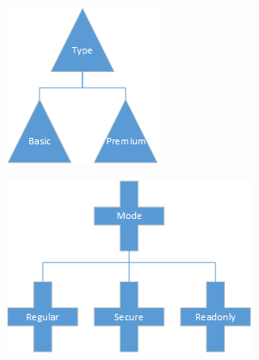 \documentclass[paper=a4, fontsize=11pt]{scrartcl} %
\numberwithin{equation}{section} %
\numberwithin{figure}{section} %
\numberwithin{table}{section} %
\begin{document}
\begin{figure}[h]
  \centering
  \begin{minipage}[b]{0.3\textwidth}
    \includegraphics[width=\textwidth]{sig_types.png}
    \label{fig:types}
    \caption{}
  \end{minipage}
  \hfill
  \begin{minipage}[b]{0.45\textwidth}
    \includegraphics[width=\textwidth]{sig_modes.png}
    \label{fig:modes}
    \caption{}
  \end{minipage}
\end{figure}
\end{document}
